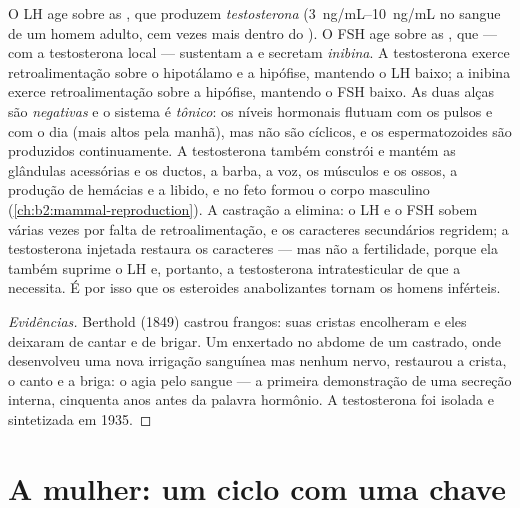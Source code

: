 \begin{proposition}\label{prop:b2:reproductive-hormones:testis}
O LH age sobre as , que produzem \emph{testosterona}
(\qtyrange{3}{10}{ng/mL} no sangue de um homem adulto, cem vezes mais
dentro do ). O FSH age sobre as , que ---
com a testosterona local --- sustentam a  e secretam
\emph{inibina}. A testosterona exerce retroalimentação sobre o
hipotálamo e a hipófise, mantendo o LH baixo; a inibina exerce
retroalimentação sobre a hipófise, mantendo o FSH baixo. As duas alças
são \emph{negativas} e o sistema é \emph{tônico}: os níveis hormonais
flutuam com os pulsos e com o dia (mais altos pela manhã), mas não são
cíclicos, e os espermatozoides são produzidos continuamente. A
testosterona também constrói e mantém as glândulas acessórias e os
ductos, a barba, a voz, os músculos e os ossos, a produção de hemácias
e a libido, e no feto formou o corpo masculino (\cref{ch:b2:mammal-reproduction}). A castração
a elimina: o LH e o FSH sobem várias vezes por falta de
retroalimentação, e os caracteres secundários regridem; a testosterona
injetada restaura os caracteres --- mas não a fertilidade, porque ela
também suprime o LH e, portanto, a testosterona intratesticular de que
a  necessita. É por isso que os esteroides anabolizantes
tornam os homens inférteis.
\end{proposition}
\begin{proof}[Evidências]
Berthold (1849) castrou frangos: suas cristas encolheram e eles
deixaram de cantar e de brigar. Um  enxertado no abdome de um
castrado, onde desenvolveu uma nova irrigação sanguínea mas nenhum
nervo, restaurou a crista, o canto e a briga: o  agia pelo
sangue --- a primeira demonstração de uma secreção interna, cinquenta
anos antes da palavra hormônio. A testosterona foi isolada e
sintetizada em 1935.
\end{proof}

\section{A mulher: um ciclo com uma chave}

